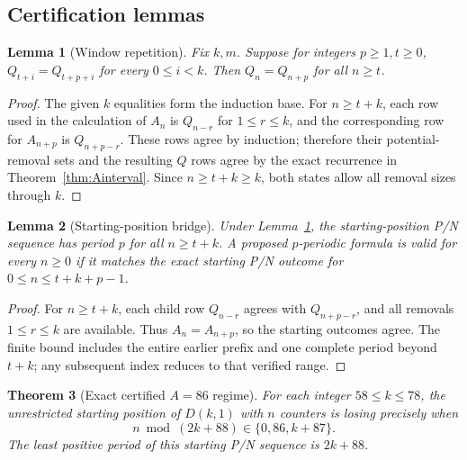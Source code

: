 \documentclass[11pt]{article}
\newtheorem{theorem}{Theorem}[section]
\newtheorem{lemma}[theorem]{Lemma}
\begin{document}
\subsection{Certification lemmas}
\begin{lemma}[Window repetition]\label{lem:Bwindow}
Fix $k,m$. Suppose for integers $p\ge1,t\ge0$,
$Q_{t+i}=Q_{t+p+i}$ for every $0\le i<k$. Then $Q_n=Q_{n+p}$ for all $n\ge t$.
\end{lemma}
\begin{proof}
The given $k$ equalities form the induction base. For $n\ge t+k$, each row used in the calculation of $A_n$ is $Q_{n-r}$ for $1\le r\le k$, and the corresponding row for $A_{n+p}$ is $Q_{n+p-r}$. These rows agree by induction; therefore their potential-removal sets and the resulting $Q$ rows agree by the exact recurrence in Theorem~\ref{thm:Ainterval}. Since $n\ge t+k\ge k$, both states allow all removal sizes through $k$.
\end{proof}
\begin{lemma}[Starting-position bridge]\label{lem:Bbridge}
Under Lemma~\ref{lem:Bwindow}, the starting-position P/N sequence has period $p$ for all $n\ge t+k$. A proposed $p$-periodic formula is valid for every $n\ge0$ if it matches the exact starting P/N outcome for $0\le n\le t+k+p-1$.
\end{lemma}
\begin{proof}For $n\ge t+k$, each child row $Q_{n-r}$ agrees with $Q_{n+p-r}$, and all removals $1\le r\le k$ are available. Thus $A_n=A_{n+p}$, so the starting outcomes agree. The finite bound includes the entire earlier prefix and one complete period beyond $t+k$; any subsequent index reduces to that verified range.\end{proof}
\begin{theorem}[Exact certified $A=86$ regime]\label{thm:B}
For each integer $58\le k\le78$, the unrestricted starting position of $D(k,1)$ with $n$ counters is losing precisely when
\[\boxed{n\bmod(2k+88)\in\{0,86,k+87\}.}\]
The least positive period of this starting P/N sequence is $2k+88$.
\end{theorem}
\end{document}
